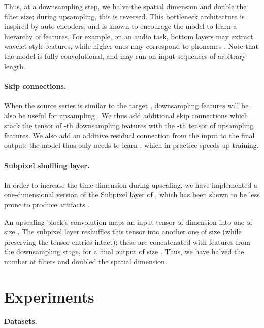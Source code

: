 \documentclass{article} \usepackage{iclr2017_workshop,times}
\begin{document}
Thus, at a downsampling step, we halve the spatial dimension and double the filter size; during upsampling, this is reversed. This bottleneck architecture is inspired by auto-encoders, and is known to encourage the model to learn a hierarchy of features. For example, on an audio task, bottom layers may extract wavelet-style features, while higher ones may correspond to phonemes \cite{DBLP:conf/nips/AytarVT16}. Note that the model is fully convolutional, and may run on input sequences of arbitrary length.

\paragraph{Skip connections.}

When the source series  is similar to the target , downsampling features will be also be useful for upsampling \citep{pix2pix2016}. We thus add additional skip connections which stack the tensor of -th downsampling features with the -th tensor of upsampling features. We also add an additive residual connection from the input to the final output: the model thus only needs to learn , which in practice speeds up training.

\paragraph{Subpixel shuffling layer.}

In order to increase the time dimension during upscaling, we have implemented a one-dimensional version of the Subpixel layer of \citet{ShiCHTABRW16}, which has been shown to be less prone to produce artifacts \citep{odena2016deconvolution}.

An upscaling block's convolution maps an input tensor of dimension  into one of size .
The subpixel layer reshuffles this  tensor into another one of size  (while preserving the tensor entries intact); these are concatenated with  features from the downsampling stage, for a final output of size . Thus, we have halved the number of filters and doubled the spatial dimension.

\section{Experiments}

\paragraph{Datasets.} 
\end{document}
